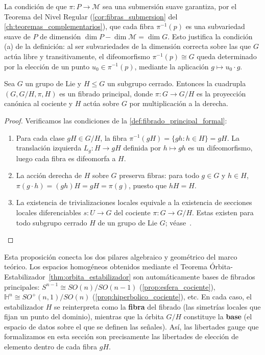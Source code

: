 \begin{remark}\label{rem:fibras_subvariedad}
La condición de que $\pi: P \to \mathcal{M}$ sea una submersión suave garantiza, por el Teorema del Nivel Regular (\autoref{cor:fibras_submersion} del \autoref{ch:teoremas_complementarios}), que cada fibra $\pi^{-1}(p)$ es una subvariedad suave de $P$ de dimensión $\dim P - \dim \mathcal{M} = \dim G$. Esto justifica la condición (a) de la definición: al ser subvariedades de la dimensión correcta sobre las que $G$ actúa libre y transitivamente, el difeomorfismo $\pi^{-1}(p) \cong G$ queda determinado por la elección de un punto $u_0 \in \pi^{-1}(p)$, mediante la aplicación $g \mapsto u_0 \cdot g$.
\end{remark}

\begin{proposition}\label{prop:homogeneo_fibrado}
Sea $G$ un grupo de Lie y $H \leq G$ un subgrupo cerrado. Entonces la cuadrupla $(G, G/H, \pi, H)$ es un fibrado principal, donde $\pi: G \to G/H$ es la proyección canónica al cociente y $H$ actúa sobre $G$ por multiplicación a la derecha.
\end{proposition}

\begin{proof}
Verificamos las condiciones de la \autoref{def:fibrado_principal_formal}:
\begin{enumerate}
	\item[(a)] Para cada clase $gH \in G/H$, la fibra $\pi^{-1}(gH) = \{gh : h \in H\} = gH$. La translación izquierda $L_g: H \to gH$ definida por $h \mapsto gh$ es un difeomorfismo, luego cada fibra es difeomorfa a $H$.

	\item[(b)] La acción derecha de $H$ sobre $G$ preserva fibras: para todo $g \in G$ y $h \in H$, $\pi(g \cdot h) = (gh)H = gH = \pi(g)$, puesto que $hH = H$.

	\item[(c)] La existencia de trivializaciones locales equivale a la existencia de secciones locales diferenciables $s: U \to G$ del cociente $\pi: G \to G/H$. Estas existen para todo subgrupo cerrado $H$ de un grupo de Lie $G$; véase~\citep[Cap.~I, Prop.~5.5]{Kobayashi1996}.
\end{enumerate}
\end{proof}

Esta proposición conecta los dos pilares algebraico y geométrico del marco teórico. Los espacios homogéneos obtenidos mediante el Teorema Órbita-Estabilizador~\ref{thm:orbita_estabilizador} son automáticamente bases de fibrados principales: $S^{n-1} \cong SO(n)/SO(n-1)$ (\autoref{prop:esfera_cociente}), $\mathbb{H}^n \cong SO^+(n,1)/SO(n)$ (\autoref{prop:hiperbolico_cociente}), etc. En cada caso, el estabilizador $H$ se reinterpreta como la \textbf{fibra} del fibrado (las simetrías locales que fijan un punto del dominio), mientras que la órbita $G/H$ constituye la \textbf{base} (el espacio de datos sobre el que se definen las señales). Así, las libertades gauge que formalizamos en esta sección son precisamente las libertades de elección de elemento dentro de cada fibra $gH$.


